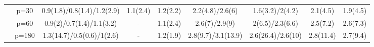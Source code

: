 \begin{table}[ht]
{\begin{tabular}{|c|c|ccccccc|}
   & p=30 & 0.9(1.8)/0.8(1.4)/1.2(2.9) & 1.1(2.4) & 1.2(2.2) & 2.2(4.8)/2.6(6) & 1.6(3.2)/2(4.2) & 2.1(4.5) & 1.9(4.5) \\ 
   & p=60 & 0.9(2)/0.7(1.4)/1.1(3.2) & - & 1.1(2.4) & 2.6(7)/2.9(9) & 2(6.5)/2.3(6.6) & 2.5(7.2) & 2.6(7.3) \\ 
   & p=180 & 1.3(14.7)/0.5(0.6)/1(2.6) & - & 1.2(1.9) & 2.8(9.7)/3.1(13.9) & 2.6(26.4)/2.6(10) & 2.8(11.4) & 2.7(9.4) \\ 
   \bottomrule 
\end{tabular}
}
\end{table}

